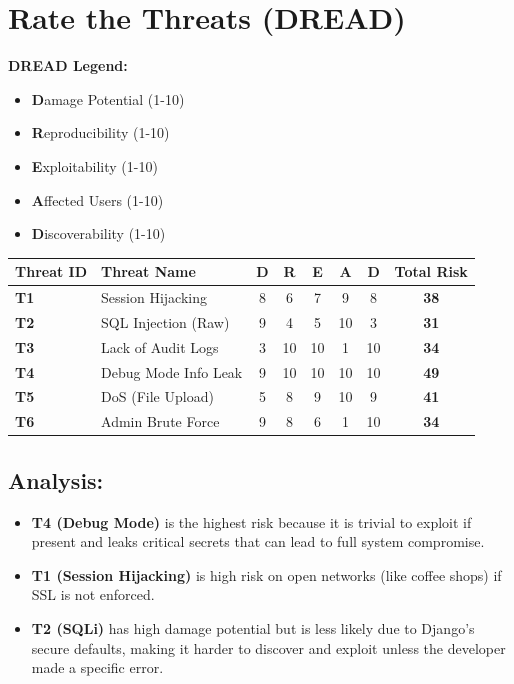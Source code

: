 \documentclass[10pt,a4paper]{article}
\begin{document}
\section*{Rate the Threats (DREAD)}

\textbf{DREAD Legend:}
\begin{itemize}
    \item \textbf{D}amage Potential (1-10)
    \item \textbf{R}eproducibility (1-10)
    \item \textbf{E}xploitability (1-10)
    \item \textbf{A}ffected Users (1-10)
    \item \textbf{D}iscoverability (1-10)
\end{itemize}

\begin{longtable}{|l|l|c|c|c|c|c|c|}
\hline
\textbf{Threat ID} & \textbf{Threat Name} & \textbf{D} & \textbf{R} & \textbf{E} & \textbf{A} & \textbf{D} & \textbf{Total Risk} \\
\hline
\endhead
\textbf{T1} & Session Hijacking & 8 & 6 & 7 & 9 & 8 & \textbf{38} \\
\hline
\textbf{T2} & SQL Injection (Raw) & 9 & 4 & 5 & 10 & 3 & \textbf{31} \\
\hline
\textbf{T3} & Lack of Audit Logs & 3 & 10 & 10 & 1 & 10 & \textbf{34} \\
\hline
\textbf{T4} & Debug Mode Info Leak & 9 & 10 & 10 & 10 & 10 & \textbf{49} \\
\hline
\textbf{T5} & DoS (File Upload) & 5 & 8 & 9 & 10 & 9 & \textbf{41} \\
\hline
\textbf{T6} & Admin Brute Force & 9 & 8 & 6 & 1 & 10 & \textbf{34} \\
\hline
\end{longtable}

\subsection*{Analysis:}
\begin{itemize}
    \item \textbf{T4 (Debug Mode)} is the highest risk because it is trivial to exploit if present and leaks critical secrets that can lead to full system compromise.
    \item \textbf{T1 (Session Hijacking)} is high risk on open networks (like coffee shops) if SSL is not enforced.
    \item \textbf{T2 (SQLi)} has high damage potential but is less likely due to Django's secure defaults, making it harder to discover and exploit unless the developer made a specific error.
\end{itemize}
\end{document}
